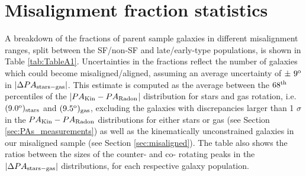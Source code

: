 \documentclass[fleqn,usenatbib]{mnras}
\begin{document}


\appendix
\section{Misalignment fraction statistics}
\label{A0}
A breakdown of the fractions of parent sample galaxies in different misalignment ranges, split between the SF/non-SF and late/early-type populations, is shown in Table \ref{tab:TableA1}. Uncertainties in the fractions reflect the number of galaxies which could become misaligned/aligned, assuming an average uncertainty of $\pm\ 9^{\rm{o}}$ in $|\Delta PA_{\rm{stars-gas}}|$. This estimate is computed as the average between the $68^{\rm{th}}$ percentiles of the |$PA_{\rm{Kin}}-PA_{\rm{Radon}}$| distribution for stars and gas rotation, i.e. $(9.0^{\rm{o}})_{\rm{stars}}$ and $(9.5^{\rm{o}})_{\rm{gas}}$, excluding the galaxies with discrepancies larger than 1 $\sigma$ in the $PA_{\rm{Kin}}-PA_{\rm{Radon}}$ distributions for either stars or gas (see Section \ref{sec:PAs_measurements}) as well as the kinematically unconstrained galaxies in our misaligned sample (see Section \ref{sec:misaligned}). The table also shows the ratios between the sizes of the counter- and co- rotating peaks in the $|\Delta PA_{\rm{stars-gas}}|$ distributions, for each respective galaxy population.
\end{document}
